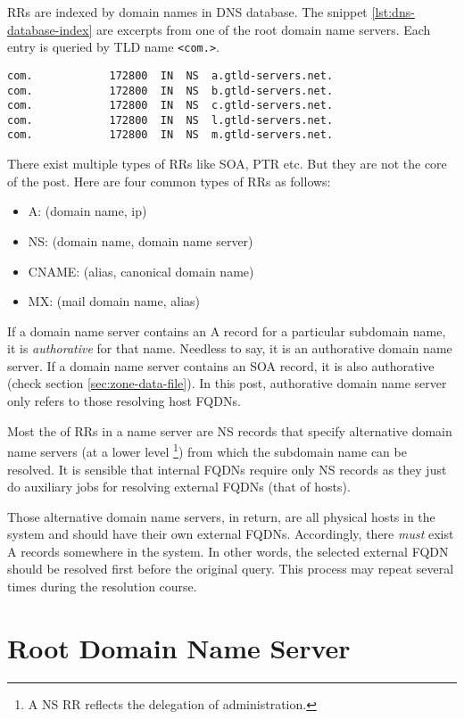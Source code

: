 RRs are indexed by domain names in DNS database. The snippet
\ref{lst:dns-database-index} are excerpts from one of the root
domain name servers. Each entry is queried by TLD name
\verb|<com.>|.

\begin{lstlisting}[caption={DNS Database Index},label={lst:dns-database-index}]
com.			172800	IN	NS	a.gtld-servers.net.
com.			172800	IN	NS	b.gtld-servers.net.
com.			172800	IN	NS	c.gtld-servers.net.
com.			172800	IN	NS	l.gtld-servers.net.
com.			172800	IN	NS	m.gtld-servers.net.
\end{lstlisting}

There exist multiple types of RRs like SOA, PTR etc. But they are
not the core of the post. Here are four common types of RRs as
follows:

\begin{itemize}
\item A: (domain name, ip)
\item NS: (domain name, domain name server)
\item CNAME: (alias, canonical domain name)
\item MX: (mail domain name, alias)
\end{itemize}

If a domain name server contains an A record for a particular
subdomain name, it is \textit{authorative} for that name. Needless
to say, it is an authorative domain name server. If a domain name
server contains an SOA record, it is also authorative (check
section \ref{sec:zone-data-file}). In this post, authorative
domain name server only refers to those resolving host FQDNs.

Most the of RRs in a name server are NS records that specify
alternative domain name servers (at a lower level \footnote{A NS
  RR reflects the delegation of administration.}) from which the
subdomain name can be resolved. It is sensible that internal FQDNs
require only NS records as they just do auxiliary jobs for
resolving external FQDNs (that of hosts).

Those alternative domain name servers, in return, are all physical
hosts in the system and should have their own external
FQDNs. Accordingly, there \textit{must} exist A records somewhere
in the system. In other words, the selected external FQDN should
be resolved first before the original query. This process may
repeat several times during the resolution course.

\section{Root Domain Name Server}
\label{sec:root-domain-name-server}

